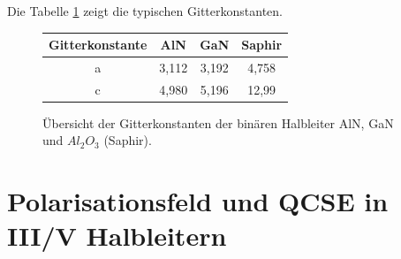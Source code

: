 %
Die Tabelle \ref{table:tab1} zeigt die typischen Gitterkonstanten.
\begin{figure}[H]
\centering
\begin{tabular}{|c|c|c|c|}
\hline
\multicolumn{1}{|l|}{Gitterkonstante} & AlN & GaN & Saphir \\ \hline \hline
a & 3,112 & 3,192 & 4,758 \\ \hline
c & 4,980 & 5,196 & 12,99 \\ \hline
\end{tabular}
\caption{Übersicht der Gitterkonstanten der binären Halbleiter AlN, GaN und $Al_{2}O_{3}$ (Saphir). ~\cite{pohl} }
\label{table:tab1}
\end{figure}

\section{Polarisationsfeld und QCSE in III/V Halbleitern}


